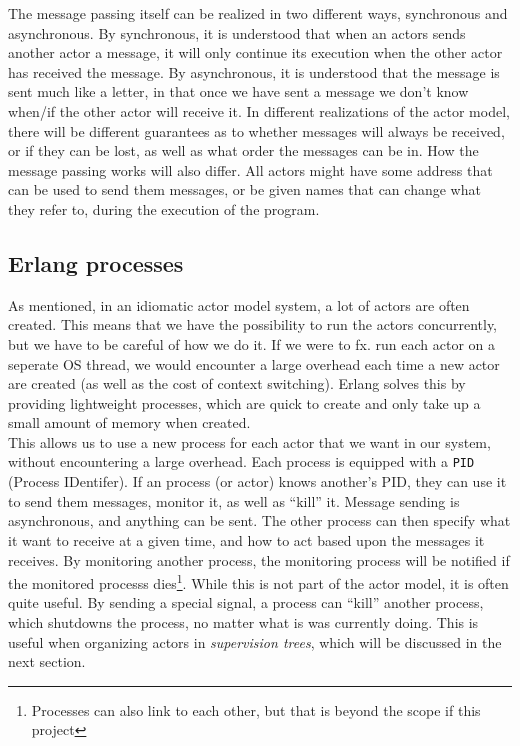 \documentclass[a4paper]{article}
\begin{document}
\noindent
The message passing itself can be realized in two different ways, synchronous
and asynchronous. By synchronous, it is understood that when an actors sends
another actor a message, it will only continue its execution when the other
actor has received the message. By asynchronous, it is understood that the
message is sent much like a letter, in that once we have sent a message we don't
know when/if the other actor will receive it. In different realizations of the
actor model, there will be different guarantees as to whether messages will
always be received, or if they can be lost, as well as what order the messages
can be in. How the message passing works will also differ. All actors might have
some address that can be used to send them messages, or be given names that can
change what they refer to, during the execution of the program.

\subsection{Erlang processes}
As mentioned, in an idiomatic actor model system, a lot of actors are often
created. This means that we have the possibility to run the actors concurrently,
but we have to be careful of how we do it. If we were to fx. run each actor on a
seperate OS thread, we would encounter a large overhead each time a new actor
are created (as well as the cost of context switching). Erlang solves this by
providing lightweight processes, which are quick to create and only take up a
small amount of memory when created.\\

\noindent This allows us to use a new process for each actor that we want in our
system, without encountering a large overhead. Each process is equipped with a
\texttt{PID} (Process IDentifer). If an process (or actor) knows another's PID,
they can use it to send them messages, monitor it, as well as ``kill'' it.
Message sending is asynchronous, and anything can be sent. The other process can
then specify what it want to receive at a given time, and how to act based upon
the messages it receives. By monitoring another process, the monitoring process
will be notified if the monitored processs dies\footnote{Processes can also link
to each other, but that is beyond the scope if this project}. While this is not
part of the actor model, it is often quite useful. By sending a special signal,
a process can ``kill'' another process, which shutdowns the process, no matter
what is was currently doing. This is useful when organizing actors in
\textit{supervision trees}, which will be discussed in the next section.
\end{document}
